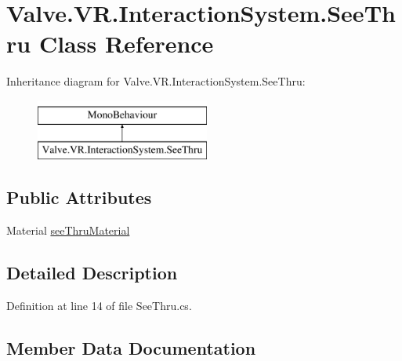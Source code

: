 \hypertarget{class_valve_1_1_v_r_1_1_interaction_system_1_1_see_thru}{}\section{Valve.\+V\+R.\+Interaction\+System.\+See\+Thru Class Reference}
\label{class_valve_1_1_v_r_1_1_interaction_system_1_1_see_thru}
Inheritance diagram for Valve.\+V\+R.\+Interaction\+System.\+See\+Thru\+:\begin{figure}[H]
\begin{center}
\leavevmode
\includegraphics[height=2.000000cm]{class_valve_1_1_v_r_1_1_interaction_system_1_1_see_thru}
\end{center}
\end{figure}
\subsection*{Public Attributes}
\begin{DoxyCompactItemize}
\item 
Material \mbox{\hyperlink{class_valve_1_1_v_r_1_1_interaction_system_1_1_see_thru_ae634a338feee782509e73600198df8d1}{see\+Thru\+Material}}
\end{DoxyCompactItemize}


\subsection{Detailed Description}


Definition at line 14 of file See\+Thru.\+cs.



\subsection{Member Data Documentation}
\mbox{\label{class_valve_1_1_v_r_1_1_interaction_system_1_1_see_thru_ae634a338feee782509e73600198df8d1}} 

